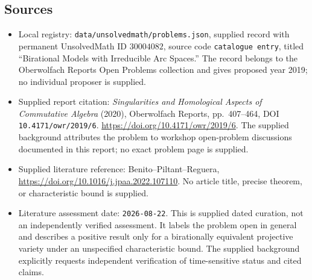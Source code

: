\documentclass[11pt]{article}
\begin{document}
\subsection{Sources}
\begin{itemize}
\item Local registry: \texttt{data/unsolvedmath/problems.json}, supplied record with permanent UnsolvedMath ID \(30004082\), source code \texttt{catalogue entry}, titled ``Birational Models with Irreducible Arc Spaces.'' The record belongs to the Oberwolfach Reports Open Problems collection and gives proposed year 2019; no individual proposer is supplied.
\item Supplied report citation: \emph{Singularities and Homological Aspects of Commutative Algebra} (2020), Oberwolfach Reports, pp.\ 407--464, DOI \texttt{10.4171/owr/2019/6}. \url{https://doi.org/10.4171/owr/2019/6}. The supplied background attributes the problem to workshop open-problem discussions documented in this report; no exact problem page is supplied.
\item Supplied literature reference: Benito--Piltant--Reguera, \url{https://doi.org/10.1016/j.jpaa.2022.107110}. No article title, precise theorem, or characteristic bound is supplied.
\item Literature assessment date: \texttt{2026-08-22}. This is supplied dated curation, not an independently verified assessment. It labels the problem open in general and describes a positive result only for a birationally equivalent projective variety under an unspecified characteristic bound. The supplied background explicitly requests independent verification of time-sensitive status and cited claims.
\end{itemize}
\end{document}
